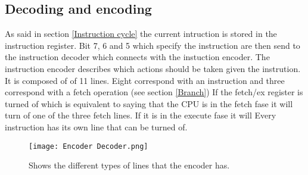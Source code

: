 \documentclass{article}
\begin{document}
\subsection{Decoding and encoding}
As said in section \ref{Instruction cycle} the current intruction is stored in the instruction register. Bit 7, 6 and 5 which specify the instruction are then send to the instruction decoder which connects with the instuction encoder. The instruction encoder describes which actions should be taken given the instrution. It is composed of of 11 lines. Eight correspond with an instruction and three correspond with a fetch operation (see section \ref{Branch}) If the fetch/ex register is turned of which is equivalent to saying that the CPU is in the fetch fase it will turn of one of the three fetch lines. If it is in the execute fase it will Every instruction has its own line that can be turned of.
\begin{figure}[h]
	\texttt{[image: Encoder Decoder.png]}
	\caption{Shows the different types of lines that the encoder has.}
\end{figure}
\end{document}

